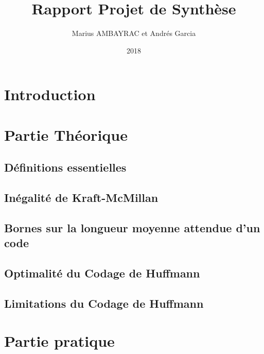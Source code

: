 \documentclass[a4paper,12pt,french]{article}
\begin{document}
\title{Rapport Projet de Synthèse}
\author{Marius AMBAYRAC et Andrés Garcia}
\date{2018}
\maketitle
\clearpage
\tableofcontents
\clearpage

\section{Introduction}

\section{Partie Théorique}

	\subsection{Définitions essentielles}
	
	\subsection{Inégalité de Kraft-McMillan}
	
	\subsection{Bornes sur la longueur moyenne attendue d'un code}
	
	\subsection{Optimalité du Codage de Huffmann}
	
	\subsection{Limitations du Codage de Huffmann}
	
\section{Partie pratique}
\end{document}
